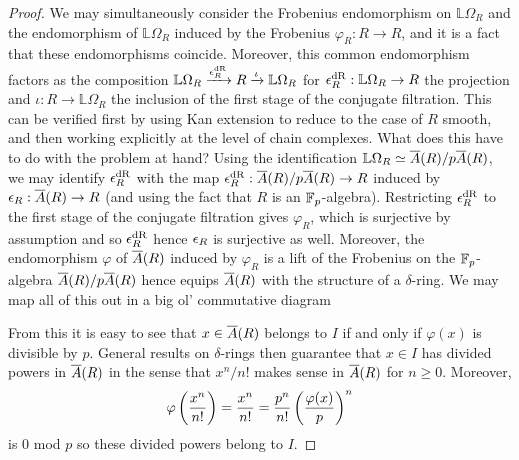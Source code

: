 \documentclass[11pt]{article}
\renewcommand{\L}{\mathbb{L}} %
\renewcommand{\phi}{\varphi}
\begin{document}
\begin{proof}
We may simultaneously consider the Frobenius endomorphism on $\L\Omega_R$ and the endomorphism of $\L\Omega_R$ induced by the Frobenius $\phi_R: R\to R$, and it is a fact that these endomorphisms coincide. Moreover, this common endomorphism factors as the composition $\L\Omega_R\xto{\eps_R^{\dR}}R\xto{\iota}\L\Omega_R$ for $\eps_R^{\dR}: \L\Omega_R\to R$ the projection and $\iota: R\to\L\Omega_R$ the inclusion of the first stage of the conjugate filtration. This can be verified first by using Kan extension to reduce to the case of $R$ smooth, and then working explicitly at the level of chain complexes. What does this have to do with the problem at hand? Using the identification $\L\Omega_R\simeq\ov{A}(R)/p\ov{A}(R)$, we may identify $\epsilon_R^{\operatorname{dR}}$ with the map $\epsilon_R^{\operatorname{dR}}: \overline{A}(R)/p\overline{A}(R)\to R$ induced by $\epsilon_R: \overline{A}(R)\to R$ (and using the fact that $R$ is an $\mathbb{F}_p$-algebra). Restricting $\epsilon_R^{\operatorname{dR}}$ to the first stage of the conjugate filtration gives $\phi_R$, which is surjective by assumption and so $\epsilon_R^{\operatorname{dR}}$ hence $\epsilon_R$ is surjective as well. Moreover, the endomorphism $\phi$ of $\overline{A}(R)$ induced by $\phi_R$ is a lift of the Frobenius on the $\mathbb{F}_p$-algebra $\overline{A}(R)/p\overline{A}(R)$ hence equips $\overline{A}(R)$ with the structure of a $\delta$-ring. We may map all of this out in a big ol' commutative diagram 
\begin{center}
\end{center}
From this it is easy to see that $x\in\overline{A}(R)$ belongs to $I$ if and only if $\phi(x)$ is divisible by $p$. General results on $\delta$-rings then guarantee that $x\in I$ has divided powers in $\overline{A}(R)$ in the sense that $x^n/n!$ makes sense in $\overline{A}(R)$ for $n\geq0$. Moreover,
\begin{align*}
\phi\paren{\df{x^n}{n!}}
=\df{x^n}{n!}
=\df{p^n}{n!}\paren{\df{\phi(x)}{p}}^n
\end{align*}
is $0$ \textup{mod} $p$ so these divided powers belong to $I$.
\end{proof}
\end{document}
